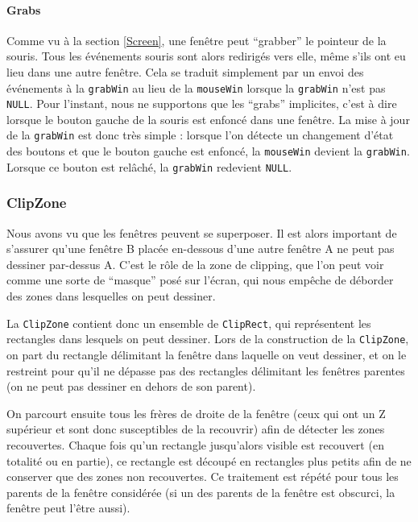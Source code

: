 \paragraph{Grabs} Comme vu à la section \ref{Screen}, une fenêtre peut ``grabber'' le pointeur de la souris. Tous les événements souris sont alors redirigés vers elle, même s'ils ont eu lieu dans une autre fenêtre. Cela se traduit simplement par un envoi des événements à la \verb|grabWin| au lieu de la \verb|mouseWin| lorsque la \verb|grabWin| n'est pas \verb|NULL|. Pour l'instant, nous ne supportons que les ``grabs'' implicites, c'est à dire lorsque le bouton gauche de la souris est enfoncé dans une fenêtre. La mise à jour de la \verb|grabWin| est donc très simple : lorsque l'on détecte un changement d'état des boutons et que le bouton gauche est enfoncé, la \verb|mouseWin| devient la \verb|grabWin|. Lorsque ce bouton est relâché, la \verb|grabWin| redevient \verb|NULL|.

\subsubsection{ClipZone}

Nous avons vu que les fenêtres peuvent se superposer. Il est alors important de s'assurer qu'une fenêtre B placée en-dessous d'une autre fenêtre A ne peut pas dessiner par-dessus A. C'est le rôle de la zone de clipping, que l'on peut voir comme une sorte de ``masque'' posé sur l'écran, qui nous empêche de déborder des zones dans lesquelles on peut dessiner.

La \verb|ClipZone| contient donc un ensemble de \verb|ClipRect|, qui représentent les rectangles dans lesquels on peut dessiner. Lors de la construction de la \verb|ClipZone|, on part du rectangle délimitant la fenêtre dans laquelle on veut dessiner, et on le restreint pour qu'il ne dépasse pas des rectangles délimitant les fenêtres parentes (on ne peut pas dessiner en dehors de son parent).

On parcourt ensuite tous les frères de droite de la fenêtre (ceux qui ont un Z supérieur et sont donc susceptibles de la recouvrir) afin de détecter les zones recouvertes. Chaque fois qu'un rectangle jusqu'alors visible est recouvert (en totalité ou en partie), ce rectangle est découpé en rectangles plus petits afin de ne conserver que des zones non recouvertes. Ce traitement est répété pour tous les parents de la fenêtre considérée (si un des parents de la fenêtre est obscurci, la fenêtre peut l'être aussi).

